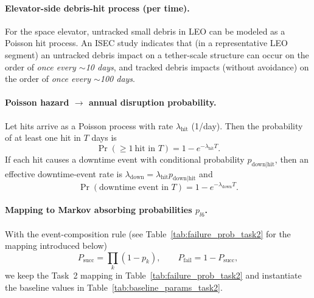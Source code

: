 ﻿\documentclass{mcmthesis}
\begin{document}
\paragraph{Elevator-side debris-hit process (per time).}
For the space elevator, untracked small debris in LEO can be modeled as a Poisson
hit process. An ISEC study indicates that (in a representative LEO segment) an
untracked debris impact on a tether-scale structure can occur on the order of
\emph{once every $\sim$10 days}, and tracked debris impacts (without avoidance)
on the order of \emph{once every $\sim$100 days}. \cite{isec_debris_2010}

\paragraph{Poisson hazard $\rightarrow$ annual disruption probability.}
Let hits arrive as a Poisson process with rate $\lambda_{\text{hit}}$ (1/day). Then the
probability of at least one hit in $T$ days is
\begin{equation}
\Pr(\ge 1\ \text{hit in }T)=1-e^{-\lambda_{\text{hit}}T}.
\end{equation}
If each hit causes a downtime event with conditional probability
$p_{\text{down}|\text{hit}}$, then an effective downtime-event rate is
$\lambda_{\text{down}}=\lambda_{\text{hit}}p_{\text{down}|\text{hit}}$ and
\begin{equation}
\Pr(\text{downtime event in }T)=1-e^{-\lambda_{\text{down}}T}.
\end{equation}

\paragraph{Mapping to Markov absorbing probabilities $p_{l6}$.}
With the event-composition rule (see Table~\ref{tab:failure_prob_task2} for the mapping introduced below)
\begin{equation}
P_{\text{succ}}=\prod_k(1-p_k),\qquad P_{\text{fail}}=1-P_{\text{succ}},
\end{equation}
we keep the Task~2 mapping in Table~\ref{tab:failure_prob_task2} and instantiate the
baseline values in Table~\ref{tab:baseline_params_task2}.
\end{document}
